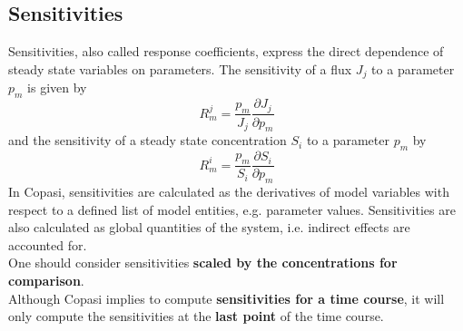 \documentclass[a4paper,11pt,twoside]{article}
\begin{document}
\subsection{Sensitivities}
\label{sub:sens}
Sensitivities, also called response coefficients, express the direct dependence of steady state variables on parameters. The sensitivity of a flux $J_j$ to a parameter $p_m$ is given by
\begin{equation*}
 R_m^j = \frac{p_m}{J_j}\frac{\partial J_j}{\partial p_m} 
\end{equation*} 
and the sensitivity of a steady state concentration $S_i$ to a parameter $p_m$ by
\begin{equation*}
R_m^i = \frac{p_m}{S_i}\frac{\partial S_i}{\partial p_m}
\end{equation*} 
In Copasi, sensitivities are calculated as the derivatives of model variables with respect to a defined list of model entities, e.g. parameter values. Sensitivities are also calculated as global quantities of the system, i.e. indirect effects are accounted for. \\
One should consider sensitivities \textbf{scaled by the concentrations  for comparison}. \\
Although Copasi implies to compute \textbf{sensitivities for a time course}, it will only compute the sensitivities at the \textbf{last point} of the time course.
\end{document}
